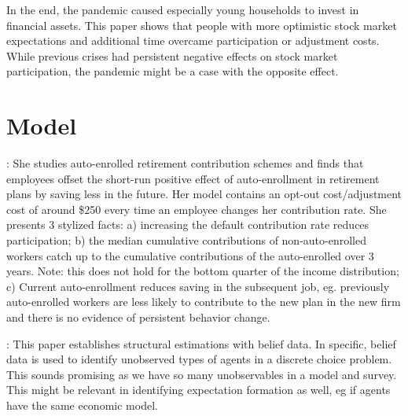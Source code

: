 \documentclass[ProjectABM]{subfiles}
\begin{document}
In the end, the pandemic caused especially young households to invest in financial assets. This paper shows that people with more optimistic stock market expectations and additional time overcame participation or adjustment costs. While previous crises had persistent negative effects on stock market participation, the pandemic might be a case with the opposite effect.%


\section{Model}

\cite{choukhmane_default_2021}: She studies auto-enrolled retirement contribution schemes and finds that employees offset the short-run positive effect of auto-enrollment in retirement plans by saving less in the future. Her model contains an opt-out cost/adjustment cost of around \$250 every time an employee changes her contribution rate.
She presents 3 stylized facts: a) increasing the default contribution rate reduces participation; b) the median cumulative contributions of non-auto-enrolled workers catch up to the cumulative contributions of the auto-enrolled over 3 years. Note: this does not hold for the bottom quarter of the income distribution; c) Current auto-enrollment reduces saving in the subsequent job, eg. previously auto-enrolled workers are less likely to contribute to the new plan in the new firm and there is no evidence of persistent behavior change.

\cite{PZ2013_expec}: This paper establishes structural estimations with belief data. In specific, belief data is used to identify unobserved types of agents in a discrete choice problem. This sounds promising as we have so many unobservables in a model and survey. This might be relevant in identifying expectation formation as well, eg if agents have the same economic model.
\end{document}

